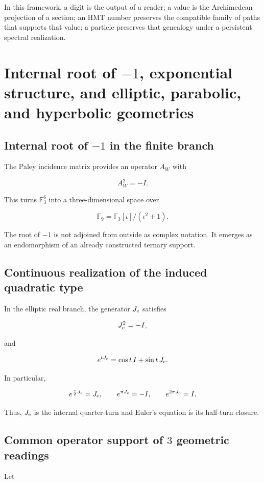In this framework, a digit is the output of a reader; a value is the Archimedean projection of a section; an HMT number preserves the compatible family of paths that supports that value; a particle preserves that genealogy under a persistent spectral realization.


\section{Internal root of \(-1\), exponential structure, and elliptic, parabolic, and hyperbolic geometries}

\subsection{Internal root of \(-1\) in the finite branch}

The Paley incidence matrix provides an operator \(A_W\) with

\[
A_W^2=-I.
\]

This turns \(\mathbb F_3^6\) into a three-dimensional space over

\[
\mathbb F_9=\mathbb F_3[\iota]/(\iota^2+1).
\]

The root of \(-1\) is not adjoined from outside as complex notation. It emerges as an endomorphism of an already constructed ternary support.

\subsection{Continuous realization of the induced quadratic type}

In the elliptic real branch, the generator \(J_{\rm e}\) satisfies

\[
J_{\rm e}^2=-I,
\]

and

\[
e^{tJ_{\rm e}}=\cos t\,I+\sin t\,J_{\rm e}.
\]

In particular,

\[
e^{\frac\pi2J_{\rm e}}=J_{\rm e},\qquad
e^{\pi J_{\rm e}}=-I,\qquad
e^{2\pi J_{\rm e}}=I.
\]

Thus, \(J_{\rm e}\) is the internal quarter-turn and Euler's equation is its half-turn closure.

\subsection{Common operator support of \(3\) geometric readings}

Let

